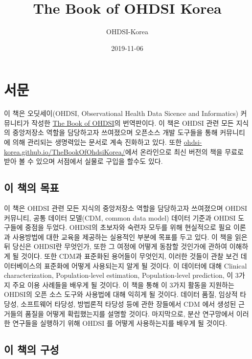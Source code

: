 \documentclass[11pt]{book}
\title{The Book of OHDSI Korea}
\author{OHDSI-Korea}
\date{2019-11-06}
\theoremstyle{definition}
\theoremstyle{definition}
\theoremstyle{definition}
\theoremstyle{remark}
\begin{document}
\maketitle

{
\setcounter{tocdepth}{1}
\tableofcontents
}
\chapter*{서문}

 이 책은 오딧세이(OHDSI, Observational Health Data Sicence and
Informatics) 커뮤니티가 작성한 \href{book.ohdsi.org}{The Book of
OHDSI}의 번역판이다. 이 책은 OHDSI 관련 모든 지식의 중앙저장소 역할을
담당하고자 쓰여졌으며 오픈소스 개발 도구들을 통해 커뮤니티에 의해
관리되는 생명력있는 문서로 계속 진화하고 있다. 또한
\href{https://ohdsi-korea.github.io/TheBookOfOhdsiKorea/}{ohdsi-korea.github.io/TheBookOfOhdsiKorea/}에서
온라인으로 최신 버전의 책을 무료로 받아 볼 수 있으며 서점에서 실물로
구입을 할수도 있다.

\section*{이 책의 목표}\label{--}

이 책은 OHDSI 관련 모든 지식의 중앙저장소 역할을 담당하고자 쓰여졌으며
OHDSI 커뮤니티, 공통 데이터 모델(CDM, common data model) 데이터 기준과
OHDSI 도구들에 중점을 두었다. OHDSI의 초보자와 숙련자 모두를 위해
현실적으로 필요 이론과 사용방법에 대한 교육을 제공하는 실용적인 부분에
목표를 두고 있다. 이 책을 읽은 뒤 당신은 OHDSI란 무엇인가, 또한 그
여정에 어떻게 동참할 것인가에 관하여 이해하게 될 것이다. 또한 CDM과
표준화된 용어들이 무엇인지, 이러한 것들이 관찰 보건 데이터베이스의
표준화에 어떻게 사용되는지 알게 될 것이다. 이 데이터에 대해 Clinical
characterization, Population-level estimation, Population-level
prediction, 이 3가지 주요 이용 사례들을 배우게 될 것이다. 이 책을 통해
이 3가지 활동을 지원하는 OHDSI의 오픈 소스 도구와 사용법에 대해 익히게
될 것이다. 데이터 품질, 임상적 타당성, 소프트웨어 타당성, 방법론적
타당성 등에 관한 장들에서 CDM 에서 생성된 근거들의 품질을 어떻게
확립했는지를 설명할 것이다. 마지막으로, 분산 연구망에서 이러한 연구들을
실행하기 위해 OHDSI 를 어떻게 사용하는지를 배우게 될 것이다.

\section*{이 책의 구성}\label{--}
\end{document}
